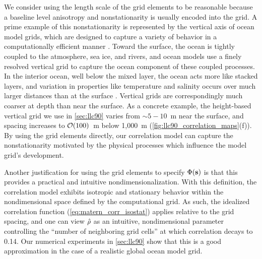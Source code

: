 We consider using the length scale of the grid elements to be reasonable
because a baseline level anisotropy and nonstationarity is usually encoded
into the grid.
A prime example of this nonstationarity is represented by the vertical axis of
ocean model grids, which are designed to capture a variety of behavior in a
computationally efficient manner \citep{griffies_fundamentals_2004}.
Toward the surface, the ocean is tightly coupled to the atmosphere, sea ice, and
rivers, and ocean models use a finely resolved vertical grid to capture the
ocean component of these coupled processes.
In the interior ocean, well below the mixed layer, the ocean acts more like stacked layers, and
variation in properties like temperature and salinity occurs over much larger
distances than at the surface \citep{talley_descriptive_2011}.
Vertical grids are correspondingly much coarser at depth than near the surface.
As a concrete example, the height-based vertical grid we use in \cref{sec:llc90}
varies from $\sim 5-10$~m near the surface, and spacing increases to
$\mathcal{O}(100)$~m below 1,000~m (\cref{fig:llc90_correlation_maps}(f)).
By using the grid elements directly, our correlation model can capture the
nonstationarity motivated by the physical processes which influence the model
grid's development.

Another justification for using the grid elements to specify $\Phi(\mathbf{s})$ is
that this provides a practical and intuitive nondimensionalization.
With this definition, the correlation model exhibits isotropic and stationary
behavior within the nondimensional space defined by the computational grid.
As such, the idealized correlation function (\cref{eq:matern_corr_isostat})
applies relative to the grid spacing, and one can view $\hat{\rho}$ as an
intuitive, nondimensional parameter controlling the
``number of neighboring grid cells'' at which correlation decays to 0.14.
Our numerical experiments in \cref{sec:llc90} show that this is a good
approximation in the case of a realistic global ocean model grid.
